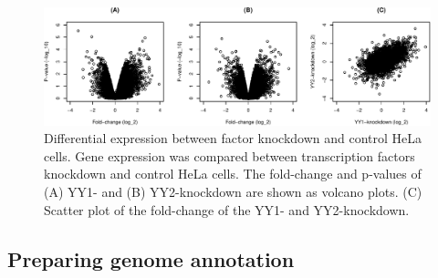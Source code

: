 \documentclass[9pt,a4paper,]{extarticle}
\newenvironment{Shaded}{\begin{snugshade}}{\end{snugshade}}
\newcommand{\AttributeTok}[1]{\textcolor[rgb]{0.77,0.63,0.00}{#1}}
\newcommand{\CommentTok}[1]{\textcolor[rgb]{0.56,0.35,0.01}{\textit{#1}}}
\newcommand{\DecValTok}[1]{\textcolor[rgb]{0.00,0.00,0.81}{#1}}
\newcommand{\FunctionTok}[1]{\textcolor[rgb]{0.00,0.00,0.00}{#1}}
\newcommand{\NormalTok}[1]{#1}
\newcommand{\SpecialCharTok}[1]{\textcolor[rgb]{0.00,0.00,0.00}{#1}}
\newcommand{\StringTok}[1]{\textcolor[rgb]{0.31,0.60,0.02}{#1}}
\begin{document}
\begin{Shaded}
\end{Shaded}

\begin{figure}

{\centering \includegraphics[width=1\linewidth]{targetFlow_files/figure-latex/foldchange-1} 

}

\caption{Differential expression between factor knockdown and control HeLa cells. Gene expression was compared between transcription factors knockdown and control HeLa cells. The fold-change and p-values of (A) YY1- and (B) YY2-knockdown are shown as volcano plots. (C) Scatter plot of the fold-change of the YY1- and YY2-knockdown.}\label{fig:foldchange}
\end{figure}

\hypertarget{preparing-genome-annotation}{%
\subsection{Preparing genome annotation}\label{preparing-genome-annotation}}
\end{document}
